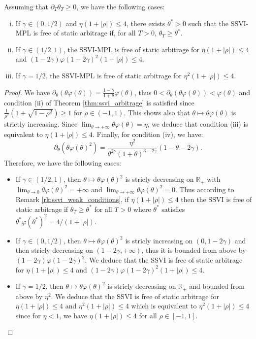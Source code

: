 \begin{proposition}\label{prop:modified_power_law}
    Assuming that $\partial_T \theta_T \ge 0$, we have the following cases:
\begin{enumerate}[(i)]
    \item If $\gamma \in (0,1/2)$ and $\eta (1+|\rho|) \le 4$, there exists $\theta^*>0$ such that the SSVI-MPL is free of static arbitrage if, for all $T>0$, $\theta_T\ge \theta^*$.
    \item If $\gamma \in (1/2,1)$, the SSVI-MPL is free of static arbitrage for $\eta(1+|\rho|) \le 4$ and $(1-2\gamma)\varphi(1-2\gamma)^2(1+|\rho|)\le 4$. 
    \item If $\gamma=1/2$, the SSVI-MPL is free of static arbitrage for $\eta^2 (1+|\rho|) \le 4$.\label{prop:pssvi_no_arbitrage}
\end{enumerate}
\begin{proof}
    We have $\partial_{\theta}(\theta\varphi(\theta)) = \frac{1-\gamma}{1+\theta}\varphi(\theta)$, thus $0< \partial_{\theta}(\theta\varphi(\theta)) < \varphi(\theta)$ and condition (ii) of Theorem \ref{thm:ssvi_arbitrage} is satisfied since $\frac{1}{\rho^2}\left(1+\sqrt{1-\rho^2} \right) \ge 1$ for $\rho \in (-1,1)$. This shows also that $\theta \mapsto \theta\varphi(\theta)$ is strictly increasing. Since $\lim_{\theta \to +\infty} \theta\varphi(\theta) = \eta$, we deduce that condition (iii) is equivalent to $\eta(1+|\rho|)\le 4$. Finally, for condition (iv), we have:
\begin{equation}
    \partial_{\theta}(\theta\varphi(\theta)^2) = \frac{\eta^2}{\theta^{2\gamma}(1+\theta)^{3-2\gamma}}(1-\theta-2\gamma).
\end{equation}
Therefore, we have the following cases:
\begin{itemize}
    \item If $\gamma \in (1/2,1)$, then $\theta\mapsto \theta\varphi(\theta)^2$ is stricly decreasing on $\mathbb{R}_+$ with $\lim_{\theta \to 0} \theta\varphi(\theta)^2 = +\infty$ and $\lim_{\theta \to +\infty}\theta\varphi(\theta)^2 = 0$. Thus according to Remark \ref{rk:ssvi_weak_conditions}, if $\eta(1+|\rho|)\le 4$ then the SSVI is free of static arbitrage if $\theta_T \ge \theta^*$ for all $T>0$ where $\theta^*$ satisfies $\theta^*\varphi(\theta^*)^2 = 4/(1+|\rho|)$. 
    \item If $\gamma \in (0,1/2)$, then $\theta\mapsto \theta\varphi(\theta)^2$ is stricly increasing on $(0,1-2\gamma)$ and then stricly decreasing on $(1-2\gamma,+\infty)$, thus it is bounded from above by $(1-2\gamma)\varphi(1-2\gamma)^2$. We deduce that the SSVI is free of static arbitrage for $\eta(1+|\rho|)\le 4$ and $(1-2\gamma)\varphi(1-2\gamma)^2(1+|\rho|)\le 4$.
    \item If $\gamma = 1/2$, then $\theta\mapsto \theta\varphi(\theta)^2$ is stricly decreasing on $\mathbb{R}_+$ and bounded from above by $\eta^2$. We deduce that the SSVI is free of static arbitrage for $\eta(1+|\rho|)\le 4$ and $\eta^2(1+|\rho|) \le 4$ which is equivalent to $\eta^2(1+|\rho|) \le 4$ since for $\eta < 1$, we have $\eta(1+|\rho|)\le 4$ for all $\rho \in [-1,1]$. 
\end{itemize}
\end{proof}
\end{proposition}

